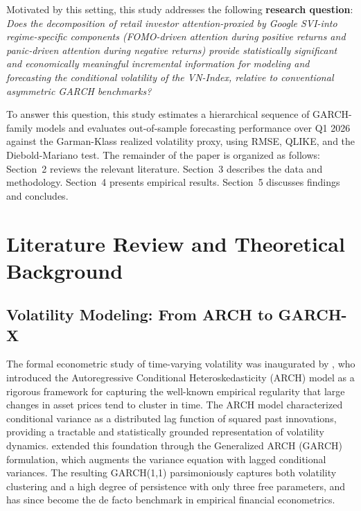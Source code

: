 \documentclass[12pt, a4paper]{article}
\begin{document}
Motivated by this setting, this study addresses the following \textbf{research question}: \textit{Does the decomposition of retail investor attention-proxied by Google SVI-into regime-specific components (FOMO-driven attention during positive returns and panic-driven attention during negative returns) provide statistically significant and economically meaningful incremental information for modeling and forecasting the conditional volatility of the VN-Index, relative to conventional asymmetric GARCH benchmarks?}

To answer this question, this study estimates a hierarchical sequence of GARCH-family models and evaluates out-of-sample forecasting performance over Q1 2026 against the Garman-Klass realized volatility proxy, using RMSE, QLIKE, and the Diebold-Mariano test. The remainder of the paper is organized as follows: Section~2 reviews the relevant literature. Section~3 describes the data and methodology. Section~4 presents empirical results. Section~5 discusses findings and concludes.

\section{Literature Review and Theoretical Background}

\subsection{Volatility Modeling: From ARCH to GARCH-X}

The formal econometric study of time-varying volatility was inaugurated by \citet{engle1982}, who introduced the Autoregressive Conditional Heteroskedasticity (ARCH) model as a rigorous framework for capturing the well-known empirical regularity that large changes in asset prices tend to cluster in time. The ARCH model characterized conditional variance as a distributed lag function of squared past innovations, providing a tractable and statistically grounded representation of volatility dynamics. \citet{bollerslev1986} extended this foundation through the Generalized ARCH (GARCH) formulation, which augments the variance equation with lagged conditional variances. The resulting GARCH(1,1) parsimoniously captures both volatility clustering and a high degree of persistence with only three free parameters, and has since become the de facto benchmark in empirical financial econometrics.
\end{document}
